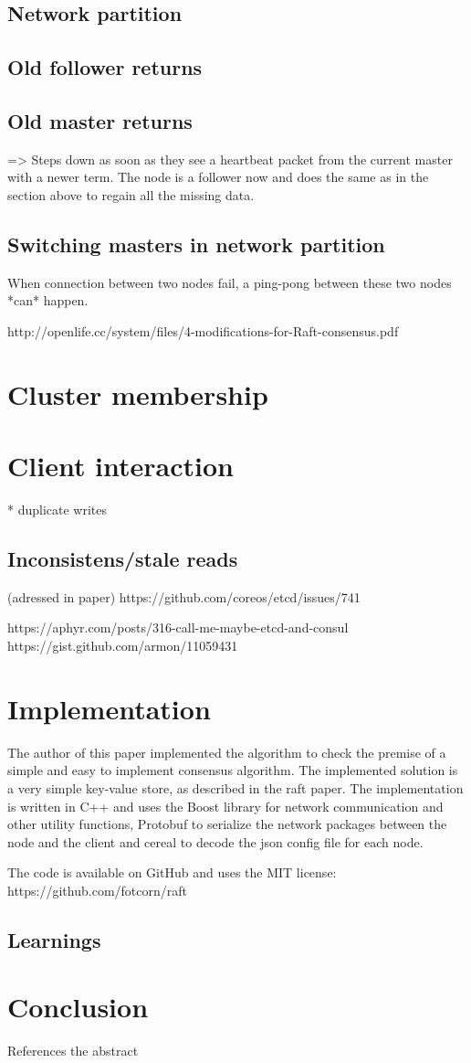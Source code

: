 \subsection{Network partition}

\subsection{Old follower returns}


\subsection{Old master returns}
=> Steps down as soon as they see a heartbeat packet from the current master with a newer term.
The node is a follower now and does the same as in the section above to regain all the missing data.

\subsection{Switching masters in network partition}
When connection between two nodes fail, a ping-pong between these two nodes *can* happen.

http://openlife.cc/system/files/4-modifications-for-Raft-consensus.pdf

\section{Cluster membership}

\section{Client interaction}

* duplicate writes



\subsection{Inconsistens/stale reads}
(adressed in paper)
https://github.com/coreos/etcd/issues/741

https://aphyr.com/posts/316-call-me-maybe-etcd-and-consul
https://gist.github.com/armon/11059431

\section {Implementation}

The author of this paper implemented the algorithm to check the premise of a simple and easy to implement consensus algorithm. The implemented solution is a very simple key-value store, as described in the raft paper. The implementation is written in C++ and uses the Boost library for network communication and other utility functions, Protobuf to serialize the network packages between the node and the client and cereal to decode the json config file for each node.

The code is available on GitHub and uses the MIT license: https://github.com/fotcorn/raft

\subsection{Learnings}

\section{Conclusion}
References the abstract


